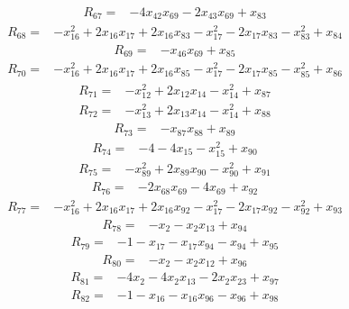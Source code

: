 \[\begin{aligned}R_{67}={}&-4x_{42}x_{69}-2x_{43}x_{69}+x_{83}
\end{aligned}\]
\[\begin{aligned}R_{68}={}&-x_{16}^{2}+2x_{16}x_{17}+2x_{16}x_{83}-x_{17}^{2}-2x_{17}x_{83}-x_{83}^{2}+x_{84}
\end{aligned}\]
\[\begin{aligned}R_{69}={}&-x_{46}x_{69}+x_{85}
\end{aligned}\]
\[\begin{aligned}R_{70}={}&-x_{16}^{2}+2x_{16}x_{17}+2x_{16}x_{85}-x_{17}^{2}-2x_{17}x_{85}-x_{85}^{2}+x_{86}
\end{aligned}\]
\[\begin{aligned}R_{71}={}&-x_{12}^{2}+2x_{12}x_{14}-x_{14}^{2}+x_{87}
\end{aligned}\]
\[\begin{aligned}R_{72}={}&-x_{13}^{2}+2x_{13}x_{14}-x_{14}^{2}+x_{88}
\end{aligned}\]
\[\begin{aligned}R_{73}={}&-x_{87}x_{88}+x_{89}
\end{aligned}\]
\[\begin{aligned}R_{74}={}&-4-4x_{15}-x_{15}^{2}+x_{90}
\end{aligned}\]
\[\begin{aligned}R_{75}={}&-x_{89}^{2}+2x_{89}x_{90}-x_{90}^{2}+x_{91}
\end{aligned}\]
\[\begin{aligned}R_{76}={}&-2x_{68}x_{69}-4x_{69}+x_{92}
\end{aligned}\]
\[\begin{aligned}R_{77}={}&-x_{16}^{2}+2x_{16}x_{17}+2x_{16}x_{92}-x_{17}^{2}-2x_{17}x_{92}-x_{92}^{2}+x_{93}
\end{aligned}\]
\[\begin{aligned}R_{78}={}&-x_{2}-x_{2}x_{13}+x_{94}
\end{aligned}\]
\[\begin{aligned}R_{79}={}&-1-x_{17}-x_{17}x_{94}-x_{94}+x_{95}
\end{aligned}\]
\[\begin{aligned}R_{80}={}&-x_{2}-x_{2}x_{12}+x_{96}
\end{aligned}\]
\[\begin{aligned}R_{81}={}&-4x_{2}-4x_{2}x_{13}-2x_{2}x_{23}+x_{97}
\end{aligned}\]
\[\begin{aligned}R_{82}={}&-1-x_{16}-x_{16}x_{96}-x_{96}+x_{98}
\end{aligned}\]
